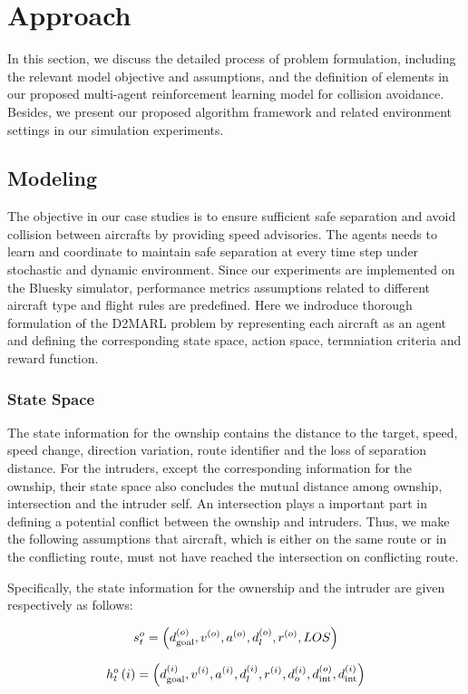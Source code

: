 \section{Approach}
In this section, we discuss the detailed process of problem formulation, including the relevant model objective and assumptions, and the definition of elements in our proposed multi-agent reinforcement learning model for collision avoidance. Besides, we present our proposed algorithm framework and related environment settings in our simulation experiments.

\subsection{Modeling}
The objective in our case studies is to ensure sufficient safe separation and avoid collision between aircrafts by providing speed advisories. The agents needs to learn and coordinate to maintain safe separation at every time step under stochastic and dynamic environment. Since our experiments are implemented on the Bluesky simulator, performance metrics assumptions related to different aircraft type and flight rules are predefined. Here we indroduce thorough formulation of the D2MARL problem by representing each aircraft as an agent and defining the corresponding state space, action space, termniation criteria and reward function.

\subsubsection{State Space}
The state information for the ownship contains the distance to the target, speed, speed change, direction variation, route identifier and the loss of separation distance. For the intruders, except the corresponding information for the ownship, their state space also concludes the mutual distance among ownship, intersection and the intruder self. An intersection plays a important part in defining a potential conflict between the ownship and intruders. Thus, we make the following assumptions that aircraft, which is either on the same route or in the conflicting route, must not have reached the intersection on conflicting route. 

Specifically, the state information for the ownership and the intruder are given respectively as follows:


$$s_t^o = \left( {d_{{\rm{goal}}}^{(o)},{v^{(o)}},{a^{(o)}},{d_l^{(o)}},{r^{(o)}},LOS} \right)$$

$$h_t^o\left( i \right) = \left( {d_{{\rm{goal}}}^{(i)},{v^{(i)}},{a^{(i)}},{d_l^{(i)}},{r^{(i)}},d_o^{(i)},d_{{\mathop{\rm int}} }^{(o)},d_{{\mathop{\rm int}} }^{(i)}} \right)$$

